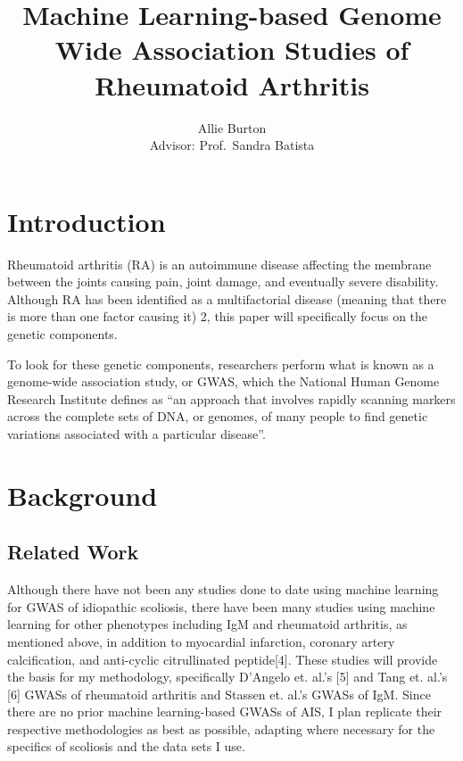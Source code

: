 \documentclass{article}
\begin{document}
\title{Machine Learning-based Genome Wide Association Studies of Rheumatoid Arthritis}

\author{Allie Burton\\Advisor: Prof.\ Sandra Batista}

\date{}
\maketitle

\doublespacing

\section*{Introduction}
Rheumatoid arthritis (RA) is an autoimmune disease affecting the membrane between the joints causing pain, joint damage, and eventually 
severe disability. Although RA has been identified as a multifactorial disease (meaning that there is more than one factor causing it)
2\cite{Alamanos2005}, this paper will specifically focus on the genetic components.

To look for these genetic components, researchers perform what is known as a genome-wide association study, or GWAS, which the National Human Genome Research Institute defines as “an approach that involves rapidly scanning markers across the complete sets of DNA, or genomes, of many people to find genetic variations associated with a particular disease”\cite{NationalHumanGenomeResearchInstitute2015}. 

\section*{Background}

\subsection*{Related Work}
Although there have not been any studies done to date using machine learning for GWAS of idiopathic scoliosis, there have been many studies using machine learning for other phenotypes including IgM and rheumatoid arthritis, as mentioned above, in addition to myocardial infarction, coronary artery calcification, and anti-cyclic citrullinated peptide[4]. These studies will provide the basis for my methodology, specifically D’Angelo et. al.’s [5] and Tang et. al.’s [6] GWASs of rheumatoid arthritis and Stassen et. al.’s GWASs of IgM. Since there are no prior machine learning-based GWASs of AIS, I plan replicate their respective methodologies as best as possible, adapting where necessary for the specifics of scoliosis and the data sets I use.



\end{document}
